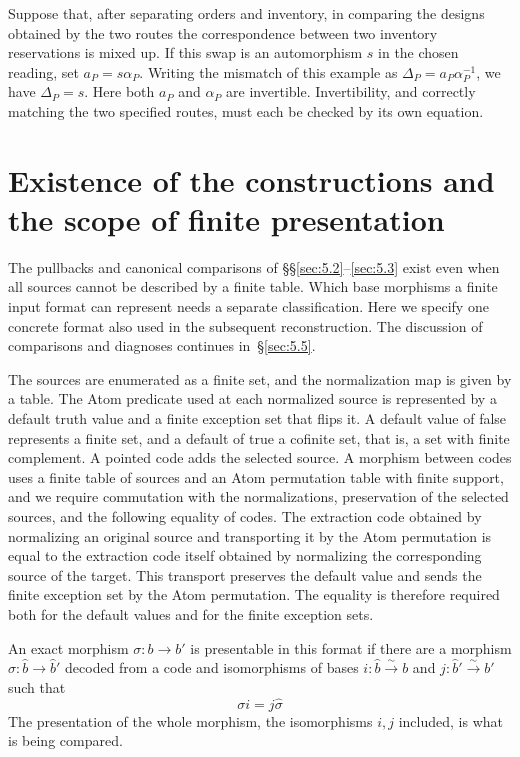 \begin{example}\label{ex:5.13}

Suppose that, after separating orders and inventory, in comparing the designs obtained by
the two routes the correspondence between two inventory reservations is mixed up. If this
swap is an automorphism $s$ in the chosen reading, set $a_P=s\alpha_P$. Writing the mismatch
of this example as $\Delta_P=a_P\alpha_P^{-1}$, we have $\Delta_P=s$. Here both $a_P$ and
$\alpha_P$ are invertible. Invertibility, and correctly matching the two specified routes,
must each be checked by its own equation.

\end{example}

\section{Existence of the constructions and the scope of finite presentation}\label{sec:5.4}

The pullbacks and canonical comparisons of \S\S\ref{sec:5.2}--\ref{sec:5.3}
exist even when all sources cannot be described by a finite table.
Which base morphisms a finite input format can represent needs a separate classification.
Here we specify one concrete format also used in the subsequent reconstruction.
The discussion of comparisons and diagnoses continues in~\S\ref{sec:5.5}.

\begin{definition}\label{def:5.14}

The sources are enumerated as a finite set, and the normalization map is given by a table.
The Atom predicate used at each normalized source is represented by a default truth value
and a finite exception set that flips it. A default value of false represents a finite set,
and a default of true a cofinite set, that is, a set with finite complement. A pointed code
adds the selected source. A morphism between codes uses a finite table of sources and an
Atom permutation table with finite support, and we require commutation with the
normalizations, preservation of the selected sources, and the following equality of codes.
The extraction code obtained by normalizing an original source and transporting it by the
Atom permutation is equal to the extraction code itself obtained by normalizing the
corresponding source of the target. This transport preserves the default value and sends the
finite exception set by the Atom permutation. The equality is therefore required both for
the default values and for the finite exception sets.

An exact morphism $\sigma:b\to b'$ is presentable in this format if there are a morphism
$\widehat\sigma:\widehat b\to\widehat b'$ decoded from a code and isomorphisms of bases
$i:\widehat b\xrightarrow{\sim}b$ and $j:\widehat b'\xrightarrow{\sim}b'$ such that
\begin{equation*}
\sigma i=j\widehat\sigma
\tag{5.20}\label{eq:5.20}
\end{equation*}
The presentation of the whole morphism, the isomorphisms $i,j$ included, is what is being
compared.

\end{definition}

